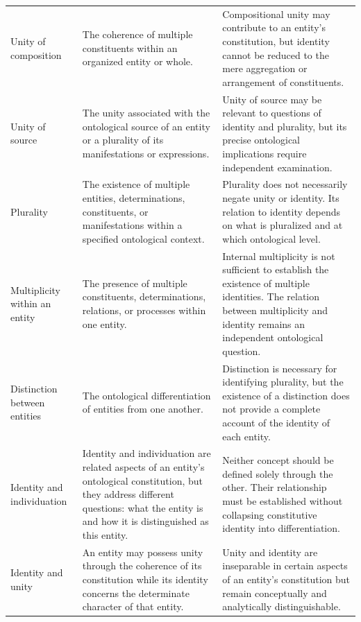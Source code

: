 \begin{table}[htbp]
\begin{tabular}{p{3.1cm} p{5.2cm} p{5.3cm}}
        Unity of composition &
        The coherence of multiple constituents within an organized entity or whole. &
        Compositional unity may contribute to an entity's constitution, but identity cannot be reduced to the mere aggregation or arrangement of constituents. \\

        Unity of source &
        The unity associated with the ontological source of an entity or a plurality of its manifestations or expressions. &
        Unity of source may be relevant to questions of identity and plurality, but its precise ontological implications require independent examination. \\

        Plurality &
        The existence of multiple entities, determinations, constituents, or manifestations within a specified ontological context. &
        Plurality does not necessarily negate unity or identity. Its relation to identity depends on what is pluralized and at which ontological level. \\

        Multiplicity within an entity &
        The presence of multiple constituents, determinations, relations, or processes within one entity. &
        Internal multiplicity is not sufficient to establish the existence of multiple identities. The relation between multiplicity and identity remains an independent ontological question. \\

        Distinction between entities &
        The ontological differentiation of entities from one another. &
        Distinction is necessary for identifying plurality, but the existence of a distinction does not provide a complete account of the identity of each entity. \\

        Identity and individuation &
        Identity and individuation are related aspects of an entity's ontological constitution, but they address different questions: what the entity is and how it is distinguished as this entity. &
        Neither concept should be defined solely through the other. Their relationship must be established without collapsing constitutive identity into differentiation. \\

        Identity and unity &
        An entity may possess unity through the coherence of its constitution while its identity concerns the determinate character of that entity. &
        Unity and identity are inseparable in certain aspects of an entity's constitution but remain conceptually and analytically distinguishable. \\

        \hline
    \end{tabular}
\end{table}
